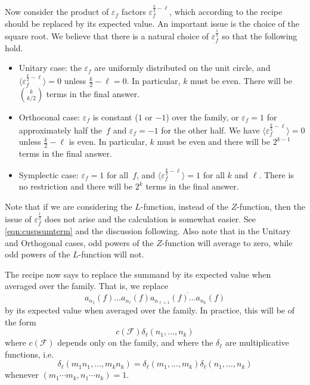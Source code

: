 \documentclass[12pt,letterpaper]{amsart}
\theoremstyle{plain}
\theoremstyle{definition}
\theoremstyle{remark}
\numberwithin{equation}{subsection}
\numberwithin{theorem}{subsection}
\numberwithin{table}{subsection}
\begin{document}
Now consider the product of $\varepsilon_f$ factors $\varepsilon_f^{\frac{k}{2}-\ell}$, 
which according
to the recipe should be replaced by its expected value.
An important issue is the choice of the square root.
We believe that there is a natural choice of $\varepsilon_f^{\frac{1}{2}}$
so that the following hold.
\begin{itemize}
\item{}Unitary case: the $\varepsilon_f$ are
uniformly distributed on the unit circle, and 
$\langle \varepsilon_f^{\frac{k}{2}-\ell}\rangle=0$ unless
$\frac{k}{2}-\ell=0$.  In particular, $k$ must be even.
There will be $\binom{k}{k/2}$ terms in the final answer.

\item{}Orthoconal case:  $\varepsilon_f$ is constant ($1$ or $-1$) over the family,
or $\varepsilon_f=1$ for approximately half the~$f$
and $\varepsilon_f=-1$ for the other half. We have
$\langle \varepsilon_f^{\frac{k}{2}-\ell}\rangle=0$ unless
$\frac{k}{2}-\ell$ is even.  In particular, $k$ must be even and
there will be $2^{k-1}$ terms in the final answer.

\item{}Symplectic case: $\varepsilon_f=1$ for all~$f$, 
and $\langle \varepsilon_f^{\frac{k}{2}-\ell}\rangle=1$ for all $k$ and $\ell$.
There is no restriction and there will be $2^k$ terms in the final answer.
\end{itemize}

Note that if we are considering the $L$-function, instead of the $Z$-function,
then the issue of $\varepsilon_f^{\frac{1}{2}}$ does not arise and
the calculation is somewhat easier.  See 
\eqref{eqn:cuspsumterm} and the discussion following.
Also note that in the Unitary and Orthogonal cases, odd powers of the
$Z$-function will average to zero,
while odd powers of the $L$-function will not.

The recipe now says to
replace the summand by its expected value when averaged over the family.
That is, we replace
\begin{equation}
a_{n_1}(f)\dots a_{n_\ell}(f)\overline {a_{n_{\ell+1}}(f)\dots a_{n_k}(f)} 
\end{equation}
by its expected value when averaged over the family.  
In practice, this will be of the form
\begin{equation}
c(\mathcal F) \delta_\ell(n_1,\dots,n_k)
\end{equation}
where $c(\mathcal F)$ depends only on the family, and where the $\delta_\ell$ are
multiplicative functions, i.e.
\begin{equation}
\delta_\ell(m_1n_1,\dots ,m_kn_k)=\delta_\ell(m_1,\dots,m_k)\delta_\ell(n_1,\dots,n_k)
\end{equation}
whenever $(m_1\cdots m_k,n_1\cdots n_k)=1$. 
\end{document}
